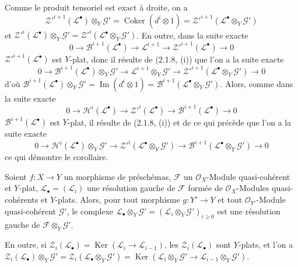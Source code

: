 Comme le produit tensoriel est exact à droite, on a
\[
\mathscr Z'^{i+1}(\mathscr L^\bullet)\otimes_Y\mathscr G'
=\operatorname{Coker}(d^i\otimes1)
=\mathscr Z'^{i+1}(\mathscr L^\bullet\otimes_Y\mathscr G')
\]
et
$\mathscr Z'^i(\mathscr L^\bullet)\otimes_Y\mathscr G'
=\mathscr Z'^i(\mathscr L^\bullet\otimes_Y\mathscr G')$. En outre, dans la
suite exacte
\[
0\to\mathscr B^{i+1}(\mathscr L^\bullet)\to\mathscr L^{i+1}
\to\mathscr Z'^{i+1}(\mathscr L^\bullet)\to0
\]
$\mathscr Z'^{i+1}(\mathscr L^\bullet)$ est $Y$-plat, donc il résulte de
(2.1.8, (i)) que l'on a la suite exacte
\[
0\to\mathscr B^{i+1}(\mathscr L^\bullet)\otimes_Y\mathscr G'
\to\mathscr L^{i+1}\otimes_Y\mathscr G'
\to\mathscr Z'^{i+1}(\mathscr L^\bullet\otimes_Y\mathscr G')\to0
\]
d'où
$\mathscr B^{i+1}(\mathscr L^\bullet)\otimes_Y\mathscr G'
=\operatorname{Im}(d^i\otimes1)
=\mathscr B^{i+1}(\mathscr L^\bullet\otimes_Y\mathscr G')$. Alors, comme
dans la suite exacte
\[
0\to\mathscr H^i(\mathscr L^\bullet)\to\mathscr Z'^i(\mathscr L^\bullet)
\to\mathscr B^{i+1}(\mathscr L^\bullet)\to0
\]
$\mathscr B^{i+1}(\mathscr L^\bullet)$ est $Y$-plat, il résulte de
(2.1.8, (i)) et de ce qui précède que l'on a la suite exacte
\[
0\to\mathscr H^i(\mathscr L^\bullet)\otimes_Y\mathscr G'
\to\mathscr Z'^i(\mathscr L^\bullet\otimes_Y\mathscr G')
\to\mathscr B^{i+1}(\mathscr L^\bullet\otimes_Y\mathscr G')\to0
\]
ce qui démontre le corollaire.

\begin{corollary}[2.1.10]
\label{IV.2.1.10-fr}
Soient $f:X\to Y$ un morphisme de préschémas, $\mathscr F$ un
$\mathcal O_X$-Module quasi-cohérent et $Y$-plat,
$\mathscr L_\bullet=(\mathscr L_i)$ une résolution gauche de $\mathscr F$
formée de $\mathcal O_X$-Modules quasi-cohérents et $Y$-plats. Alors, pour
tout morphisme $g:Y'\to Y$ et tout $\mathcal O_{Y'}$-Module quasi-cohérent
$\mathscr G'$, le complexe
$\mathscr L_\bullet\otimes_Y\mathscr G'=
(\mathscr L_i\otimes_Y\mathscr G')_{i\geq0}$ est une résolution gauche de
$\mathscr F\otimes_Y\mathscr G'$.

En outre, si
$\mathscr Z_i(\mathscr L_\bullet)=\operatorname{Ker}
(\mathscr L_i\to\mathscr L_{i-1})$, les $\mathscr Z_i(\mathscr L_\bullet)$
sont $Y$-plats, et l'on a
$\mathscr Z_i(\mathscr L_\bullet)\otimes_Y\mathscr G'
=\mathscr Z_i(\mathscr L_\bullet\otimes_Y\mathscr G')
=\operatorname{Ker}(\mathscr L_i\otimes_Y\mathscr G'
\to\mathscr L_{i-1}\otimes_Y\mathscr G')$.
\end{corollary}

